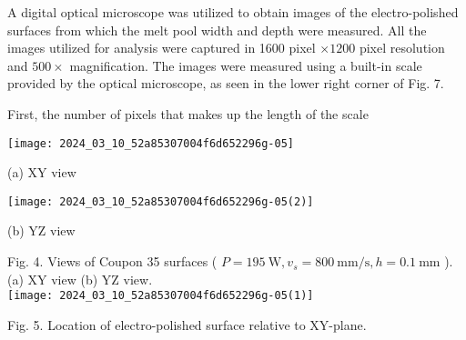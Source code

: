 \documentclass[10pt]{article}
\begin{document}
A digital optical microscope was utilized to obtain images of the electro-polished surfaces from which the melt pool width and depth were measured. All the images utilized for analysis were captured in 1600 pixel $\times 1200$ pixel resolution and $500 \times$ magnification. The images were measured using a built-in scale provided by the optical microscope, as seen in the lower right corner of Fig. 7.

First, the number of pixels that makes up the length of the scale

\begin{center}
\texttt{[image: 2024\_03\_10\_52a85307004f6d652296g-05]}
\end{center}

(a) $\mathrm{XY}$ view

\begin{center}
\texttt{[image: 2024\_03\_10\_52a85307004f6d652296g-05(2)]}
\end{center}

(b) YZ view

Fig. 4. Views of Coupon 35 surfaces ( $P=195 \mathrm{~W}, v_{s}=800 \mathrm{~mm} / \mathrm{s}, h=0.1 \mathrm{~mm}$ ). (a) XY view (b) YZ view.\\
\texttt{[image: 2024\_03\_10\_52a85307004f6d652296g-05(1)]}

Fig. 5. Location of electro-polished surface relative to XY-plane.
\end{document}
